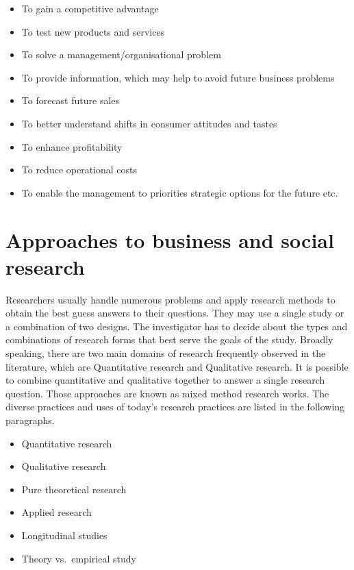 \documentclass[
  letterpaper,
  DIV=11,
  numbers=noendperiod]{scrreprt}
\providecommand{\tightlist}{%
  \setlength{\itemsep}{0pt}\setlength{\parskip}{0pt}}\usepackage{longtable,booktabs,array}
\begin{document}
\begin{itemize}
\tightlist
\item
  To gain a competitive advantage
\item
  To test new products and services
\item
  To solve a management/organisational problem
\item
  To provide information, which may help to avoid future business
  problems
\item
  To forecast future sales
\item
  To better understand shifts in consumer attitudes and tastes
\item
  To enhance profitability
\item
  To reduce operational costs
\item
  To enable the management to priorities strategic options for the
  future etc.
\end{itemize}

\section{Approaches to business and social
research}\label{approaches-to-business-and-social-research}

Researchers usually handle numerous problems and apply research methods
to obtain the best guess answers to their questions. They may use a
single study or a combination of two designs. The investigator has to
decide about the types and combinations of research forms that best
serve the goals of the study. Broadly speaking, there are two main
domains of research frequently observed in the literature, which are
Quantitative research and Qualitative research. It is possible to
combine quantitative and qualitative together to answer a single
research question. Those approaches are known as mixed method research
works. The diverse practices and uses of today's research practices are
listed in the following paragraphs.

\begin{itemize}
\tightlist
\item
  Quantitative research
\item
  Qualitative research
\item
  Pure theoretical research
\item
  Applied research
\item
  Longitudinal studies
\item
  Theory vs.~empirical study
\end{itemize}
\end{document}
